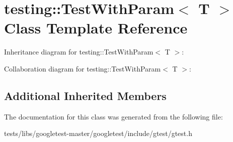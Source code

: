 \hypertarget{classtesting_1_1TestWithParam}{}\section{testing\+:\+:Test\+With\+Param$<$ T $>$ Class Template Reference}
\label{classtesting_1_1TestWithParam}


Inheritance diagram for testing\+:\+:Test\+With\+Param$<$ T $>$\+:


Collaboration diagram for testing\+:\+:Test\+With\+Param$<$ T $>$\+:
\subsection*{Additional Inherited Members}


The documentation for this class was generated from the following file\+:\begin{DoxyCompactItemize}
\item 
tests/libs/googletest-\/master/googletest/include/gtest/gtest.\+h\end{DoxyCompactItemize}
